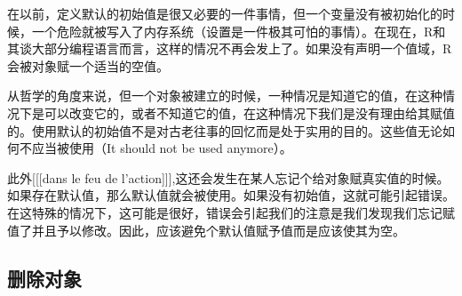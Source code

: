 \documentclass[12pt,a4paper]{article}\usepackage{graphicx, color}
\begin{document}
\scalebox{4}{\HandRight}在以前，定义默认的初始值是很又必要的一件事情，但一个变量没有被初始化的时候，一个危险就被写入了内存系统（设置是一件极其可怕的事情）。在现在，R和其谈大部分编程语言而言，这样的情况不再会发上了。如果没有声明一个值域，R会被对象赋一个适当的空值。

从哲学的角度来说，但一个对象被建立的时候，一种情况是知道它的值，在这种情况下是可以改变它的，或者不知道它的值，在这种情况下我们是没有理由给其赋值的。使用默认的初始值不是对古老往事的回忆而是处于实用的目的。这些值无论如何不应当被使用（It should not be used anymore）。

此外[[[dans le feu de l’action]]],这还会发生在某人忘记个给对象赋真实值的时候。如果存在默认值，那么默认值就会被使用。如果没有初始值，这就可能引起错误。在这特殊的情况下，这可能是很好，错误会引起我们的注意是我们发现我们忘记赋值了并且予以修改。因此，应该避免个默认值赋予值而是应该使其为空。

\subsection{删除对象}
\end{document}

